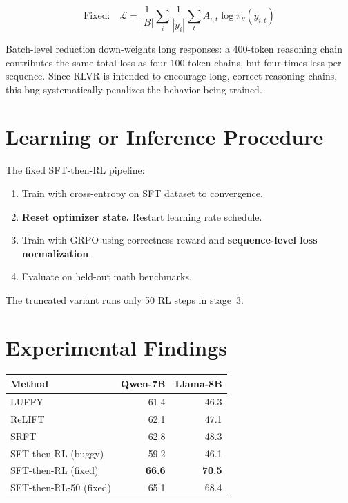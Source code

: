\documentclass[10pt,twocolumn]{article}
\begin{document}
\begin{equation}
\text{Fixed:}\quad \mathcal{L} = \frac{1}{|B|}\sum_i \frac{1}{|y_i|}\sum_t A_{i,t} \log \pi_\theta(y_{i,t})
\end{equation}

Batch-level reduction down-weights long responses: a 400-token reasoning chain contributes the same total loss as four 100-token chains, but four times less per sequence.
Since RLVR is intended to encourage long, correct reasoning chains, this bug systematically penalizes the behavior being trained.

\section{Learning or Inference Procedure}

The fixed SFT-then-RL pipeline:
\begin{enumerate}[leftmargin=1.5em,itemsep=1pt]
  \item Train with cross-entropy on SFT dataset to convergence.
  \item \textbf{Reset optimizer state.} Restart learning rate schedule.
  \item Train with GRPO using correctness reward and \textbf{sequence-level loss normalization}.
  \item Evaluate on held-out math benchmarks.
\end{enumerate}

The truncated variant runs only 50 RL steps in stage~3.

\section{Experimental Findings}

\begin{center}
\small
\begin{tabular}{lrr}
\toprule
\textbf{Method} & \textbf{Qwen-7B} & \textbf{Llama-8B} \\
\midrule
LUFFY & 61.4 & 46.3 \\
ReLIFT & 62.1 & 47.1 \\
SRFT & 62.8 & 48.3 \\
SFT-then-RL (buggy) & 59.2 & 46.1 \\
SFT-then-RL (fixed) & \textbf{66.6} & \textbf{70.5} \\
SFT-then-RL-50 (fixed) & 65.1 & 68.4 \\
\bottomrule
\end{tabular}
\end{center}
\end{document}
